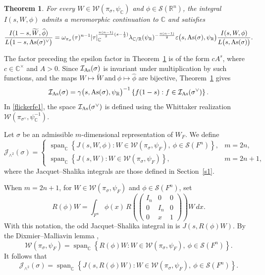 \documentclass[12pt,reqno]{amsart}
\numberwithin{equation}{section}%
\numberwithin{equation}{subsection}
\newtheorem{thm}[equation]{Theorem}%
\theoremstyle{definition}
\theoremstyle{remark}
\begin{document}
\begin{thm}
\label{fe1}
For every
\(W\in\mathcal{W}(\pi_\sigma,\psi_{\mathbb{C}})\) and
\(\phi\in\mathcal{S}(\mathbb{R}^n)\), the integral \(I(s,W,\phi)\)
admits a meromorphic continuation to \(\mathbb{C}\) and satisfies
\[
\frac{I(1-s,\widetilde W,\widehat\phi)}
     {L\bigl(1-s,{\rm As}(\sigma)^\vee\bigr)}
=
\omega_{\pi_\sigma}(\tau)^{n-1}
|\tau|_{\mathbb{C}}^{\frac{n(n-1)}{2}(s-\frac12)}
\lambda_{\mathbb{C}/\mathbb{R}}(\psi_{\mathbb{R}})
^{-\frac{n(n-1)}{2}}
\varepsilon\bigl(s,{\rm As}(\sigma),\psi_{\mathbb{R}}\bigr)
\frac{I(s,W,\phi)}
     {L\bigl(s,{\rm As}(\sigma)\bigr)}.
\]
\end{thm}

The factor preceding the epsilon factor in Theorem~\ref{fe1} is of the
form \(cA^s\), where \(c\in\mathbb{C}^{\times}\) and \(A>0\). Since
\(\mathcal I_{{\rm As}}(\sigma)\) is invariant under multiplication by
such functions, and the maps
$W\longmapsto\widetilde W
\>\text{and}\>
\phi\longmapsto\widehat\phi
$ are bijective, Theorem~\ref{fe1} gives
\begin{equation}\label{flickerfe1}
\mathcal{I}_{{\rm As}}(\sigma)
=
\gamma\bigl(s,{\rm As}(\sigma),\psi_{\mathbb{R}}\bigr)^{-1}
\left\{
f(1-s):
f\in\mathcal{I}_{{\rm As}}(\sigma^\vee)
\right\}.
\end{equation}
In \eqref{flickerfe1}, the space
\(\mathcal{I}_{{\rm As}}(\sigma^\vee)\) is defined using the Whittaker realization
\(\mathcal{W}(\pi_{\sigma^\vee},\psi_{\mathbb{C}}^{-1})\).

Let \(\sigma\) be an admissible \(m\)-dimensional representation of
\(W_F\). We define
\[
\mathcal{J}_{\wedge^2}(\sigma)
=
\begin{cases}
\displaystyle
\operatorname{span}_{\mathbb{C}}
\left\{
J(s,W,\phi):
W\in\mathcal{W}(\pi_\sigma,\psi_F),\
\phi\in\mathcal{S}(F^n)
\right\},
& m=2n,\\[4mm]
\displaystyle
\operatorname{span}_{\mathbb{C}}
\left\{
J(s,W):
W\in\mathcal{W}(\pi_\sigma,\psi_F)
\right\},
& m=2n+1,
\end{cases}
\]
where the Jacquet--Shalika integrals are those defined in
Section~\ref{s1}.

When \(m=2n+1\), for
\(W\in\mathcal{W}(\pi_\sigma,\psi_F)\) and
\(\phi\in\mathcal{S}(F^n)\), set
\[
R(\phi)W
=
\int_{F^n}
\phi(x)\,
R\left(
\begin{pmatrix}
I_n&0&0\\
0&I_n&0\\
0&x&1
\end{pmatrix}
\right)W\,dx.
\]
With this notation, the odd Jacquet--Shalika integral in
\cite[(2.9), (3.4)]{JLST2025} is \(J(s,R(\phi)W)\). By the
Dixmier--Malliavin lemma \cite[Lemma~6.1]{Jac2009},
\[
\mathcal{W}(\pi_\sigma,\psi_F)
=
\operatorname{span}_{\mathbb{C}}
\left\{
R(\phi)W:
W\in\mathcal{W}(\pi_\sigma,\psi_F),\
\phi\in\mathcal{S}(F^n)
\right\}.
\]
It follows that
\[
\mathcal{J}_{\wedge^2}(\sigma)
=
\operatorname{span}_{\mathbb{C}}
\left\{
J(s,R(\phi)W):
W\in\mathcal{W}(\pi_\sigma,\psi_F),\
\phi\in\mathcal{S}(F^n)
\right\}.
\]
\end{document}
